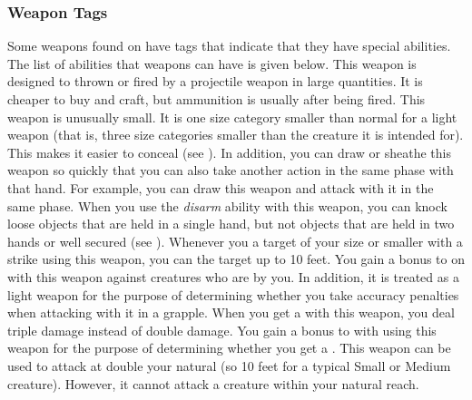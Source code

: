        \subsubsection{Weapon Tags}\label{Weapon Tags}
            Some weapons found on  have tags that indicate that they have special abilities. The list of abilities that weapons can have is given below.
             This weapon is designed to thrown or fired by a projectile weapon in large quantities. It is cheaper to buy and craft, but ammunition is usually  after being fired.
             This weapon is unusually small.
            It is one size category smaller than normal for a light weapon (that is, three size categories smaller than the creature it is intended for).
            This makes it easier to conceal (see ).
            In addition, you can draw or sheathe this weapon so quickly that you can also take another action in the same phase with that hand.
            For example, you can draw this weapon and attack with it in the same phase.
             When you use the \textit{disarm} ability with this weapon, you can knock loose objects that are held in a single hand, but not objects that are held in two hands or well secured (see ).
             Whenever you  a target of your size or smaller with a strike using this weapon, you can  the target up to 10 feet.
             You gain a  bonus to  on  with this weapon against creatures who are  by you.
            In addition, it is treated as a light weapon for the purpose of determining whether you take accuracy penalties when attacking with it in a grapple.
             When you get a  with this weapon, you deal triple damage instead of double damage.
             You gain a  bonus to  with  using this weapon for the purpose of determining whether you get a .
            \label{Long Weapon} This weapon can be used to attack at double your natural  (so 10 feet for a typical Small or Medium creature).
            However, it cannot attack a creature within your natural reach.

